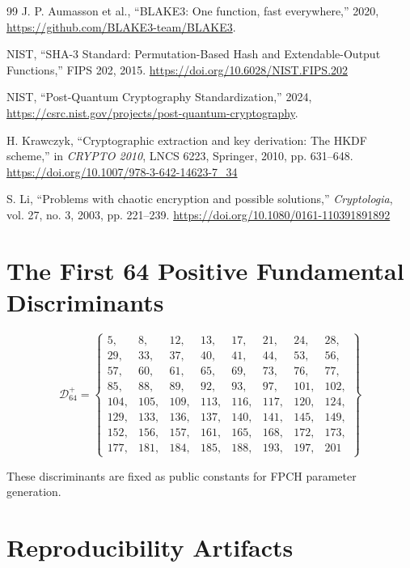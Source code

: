 \documentclass[11pt,a4paper]{article}
\theoremstyle{plain}
\theoremstyle{definition}
\theoremstyle{remark}
\begin{document}
\begin{thebibliography}{99}
J. P. Aumasson et al., ``BLAKE3: One function, fast everywhere,'' 2020, \url{https://github.com/BLAKE3-team/BLAKE3}.

NIST, ``SHA-3 Standard: Permutation-Based Hash and Extendable-Output Functions,'' FIPS 202, 2015. \url{https://doi.org/10.6028/NIST.FIPS.202}

NIST, ``Post-Quantum Cryptography Standardization,'' 2024, \url{https://csrc.nist.gov/projects/post-quantum-cryptography}.

H. Krawczyk, ``Cryptographic extraction and key derivation: The HKDF scheme,'' in \textit{CRYPTO 2010}, LNCS 6223, Springer, 2010, pp. 631--648. \url{https://doi.org/10.1007/978-3-642-14623-7_34}

S. Li, ``Problems with chaotic encryption and possible solutions,'' \textit{Cryptologia}, vol. 27, no. 3, 2003, pp. 221--239. \url{https://doi.org/10.1080/0161-110391891892}

\end{thebibliography}

\appendix
\section{The First 64 Positive Fundamental Discriminants}

\begin{equation}
\mathcal{D}^+_{64} = \left\{ \begin{array}{llllllll}
5, & 8, & 12, & 13, & 17, & 21, & 24, & 28, \\
29, & 33, & 37, & 40, & 41, & 44, & 53, & 56, \\
57, & 60, & 61, & 65, & 69, & 73, & 76, & 77, \\
85, & 88, & 89, & 92, & 93, & 97, & 101, & 102, \\
104, & 105, & 109, & 113, & 116, & 117, & 120, & 124, \\
129, & 133, & 136, & 137, & 140, & 141, & 145, & 149, \\
152, & 156, & 157, & 161, & 165, & 168, & 172, & 173, \\
177, & 181, & 184, & 185, & 188, & 193, & 197, & 201
\end{array} \right\}
\end{equation}

These discriminants are fixed as public constants for FPCH parameter generation.

\section{Reproducibility Artifacts}
\end{document}
